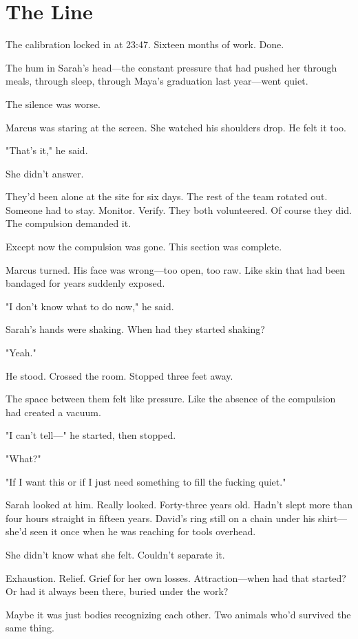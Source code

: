 \chapter{The Line}
\label{ch:29}


The calibration locked in at 23:47. Sixteen months of work. Done.

The hum in Sarah's head—the constant pressure that had pushed her through meals, through sleep, through Maya's graduation last year—went quiet.

The silence was worse.

Marcus was staring at the screen. She watched his shoulders drop. He felt it too.

"That's it," he said.

She didn't answer.

They'd been alone at the site for six days. The rest of the team rotated out. Someone had to stay. Monitor. Verify. They both volunteered. Of course they did. The compulsion demanded it.

Except now the compulsion was gone. This section was complete.

Marcus turned. His face was wrong—too open, too raw. Like skin that had been bandaged for years suddenly exposed.

"I don't know what to do now," he said.

Sarah's hands were shaking. When had they started shaking?

"Yeah."

He stood. Crossed the room. Stopped three feet away.

The space between them felt like pressure. Like the absence of the compulsion had created a vacuum.

"I can't tell—" he started, then stopped.

"What?"

"If I want this or if I just need something to fill the fucking quiet."

Sarah looked at him. Really looked. Forty-three years old. Hadn't slept more than four hours straight in fifteen years. David's ring still on a chain under his shirt—she'd seen it once when he was reaching for tools overhead.

She didn't know what she felt. Couldn't separate it.

Exhaustion. Relief. Grief for her own losses. Attraction—when had that started? Or had it always been there, buried under the work?

Maybe it was just bodies recognizing each other. Two animals who'd survived the same thing.

